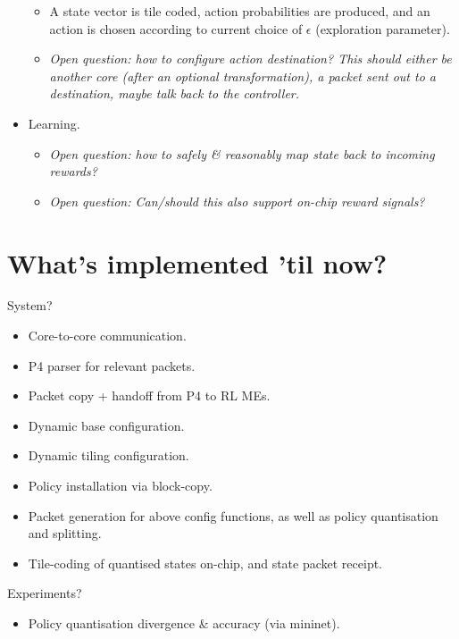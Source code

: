 \documentclass[sigconf,natbib=false]{acmart}
\begin{document}
\begin{itemize}
\begin{itemize}
		\item A state vector is tile coded, action probabilities are produced, and an action is chosen according to current choice of $\epsilon$ (exploration parameter).
		\item \emph{Open question: how to configure action destination? This should either be another core (after an optional transformation), a packet sent out to a destination, maybe talk back to the controller.}
	\end{itemize}
	\item Learning.
	\begin{itemize}
		\item \emph{Open question: how to safely \& reasonably map state back to incoming rewards?}
		\item \emph{Open question: Can/should this also support on-chip reward signals?}
	\end{itemize}
\end{itemize}

\section{What's implemented 'til now?}
System?
\begin{itemize}
	\item Core-to-core communication.
	\item P4 parser for relevant packets.
	\item Packet copy + handoff from P4 to RL MEs.
	\item Dynamic base configuration.
	\item Dynamic tiling configuration.
	\item Policy installation via block-copy.
	\item Packet generation for above config functions, as well as policy quantisation and splitting.
	\item Tile-coding of quantised states on-chip, and state packet receipt.
\end{itemize}

Experiments?
\begin{itemize}
	\item Policy quantisation divergence \& accuracy (via mininet).
\end{itemize}
\end{document}

